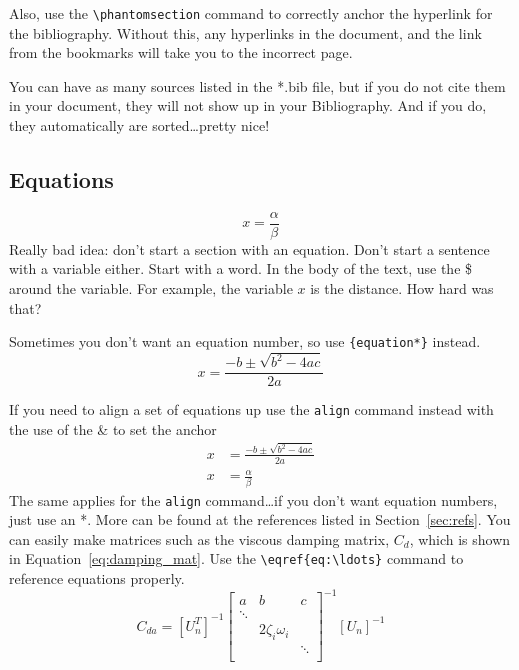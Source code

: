 \documentclass[12pt]{report}
\begin{document}
Also, use the \verb'\phantomsection' command to correctly anchor the hyperlink for the bibliography.  Without this, any hyperlinks in the document, and the link from the bookmarks will take you to the incorrect page.

You can have as many sources listed in the *.bib file, but if you do not cite them in your document, they will not show up in your Bibliography.  And if you do, they automatically are sorted\ldots pretty nice!  

\subsection{Equations}\label{sec:equations}
\begin{equation}\label{eq:alphaoverbeta} %
x=\frac{\alpha}{\beta}
\end{equation}
Really bad idea: don't start a section with an equation. Don't start a sentence with a variable either. Start with a word. In the body of the text, use the \$ around the variable.  For example, the variable $x$ is the distance. How hard was that?

Sometimes you don't want an equation  number, so use \verb'{equation*}' instead.
\begin{equation*}
x=\frac{-b\pm\sqrt{b^2-4ac}}{2a}
\end{equation*}

If you need to align a set of equations up use the \verb'align' command instead with the use of the \& to set the anchor
\begin{align}
x&=\frac{-b\pm\sqrt{b^2-4ac}}{2a}\\
x&=\frac{\alpha}{\beta}
\end{align}
The same applies for the \verb'align' command\ldots if you don\rq{}t want equation numbers,  just use an *.  More can be found at the references listed in Section~\ref{sec:refs}.  You can easily make matrices such as the viscous damping matrix, $C_d$, which is shown in Equation~\eqref{eq:damping_mat}.  Use the \verb'\eqref{eq:\ldots}' command to reference equations properly.
%
\begin{equation}
\label{eq:damping_mat}
C_{da} =[U_n^T]^{-1}
\left[ \begin{array}{ccc}
a&b&c\\
	\ddots & 				& \\
	     	& 2 \zeta_i \omega_i 		& \\
		&				& \ddots \\
\end{array} \right]^{{-1}} [U_n]^{-1}
\end{equation}
\end{document}
